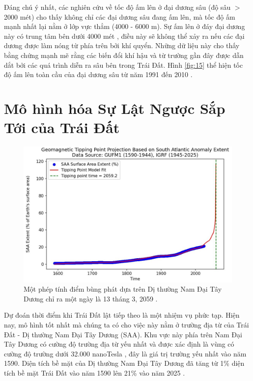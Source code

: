 \documentclass[10pt,twocolumn,letterpaper]{article}
\begin{document}
Đáng chú ý nhất, các nghiên cứu về tốc độ ấm lên ở đại dương sâu (độ sâu $>$2000 mét) cho thấy không chỉ các đại dương sâu đang ấm lên, mà tốc độ ấm mạnh nhất lại nằm ở lớp vực thẳm (4000 - 6000 m). Sự ấm lên ở đáy đại dương này có trung tâm bên dưới 4000 mét \cite{132,129}, điều này sẽ không thể xảy ra nếu các đại dương được làm nóng từ phía trên bởi khí quyển. Những dữ liệu này cho thấy bằng chứng mạnh mẽ rằng các biến đổi khí hậu và từ trường gần đây được dẫn dắt bởi các quá trình diễn ra sâu bên trong Trái Đất. Hình \ref{fig:15} thể hiện tốc độ ấm lên toàn cầu của đại dương sâu từ năm 1991 đến 2010 \cite{132}.

\section{Mô hình hóa Sự Lật Ngược Sắp Tới của Trái Đất}
\begin{figure}[b]
\begin{center}
   \includegraphics[width=1\linewidth]{saa-crop.jpeg}
\end{center}
   \caption{Một phép tính điểm bùng phát dựa trên Dị thường Nam Đại Tây Dương chỉ ra một ngày là 13 tháng 3, 2059 \cite{125,126}.}
\label{fig:16}
\label{fig:onecol}
\end{figure}

Dự đoán thời điểm khi Trái Đất lật tiếp theo là một nhiệm vụ phức tạp. Hiện nay, mô hình tốt nhất mà chúng ta có cho việc này nằm ở trường địa từ của Trái Đất - Dị thường Nam Đại Tây Dương (SAA). Khu vực này phía trên Nam Đại Tây Dương có cường độ trường địa từ yếu nhất và được xác định là vùng có cường độ trường dưới 32.000 nanoTesla \cite{135}, đây là giá trị trường yếu nhất vào năm 1590. Diện tích bề mặt của Dị thường Nam Đại Tây Dương đã tăng từ 1\% diện tích bề mặt Trái Đất vào năm 1590 lên 21\% vào năm 2025 \cite{136}.
\end{document}
